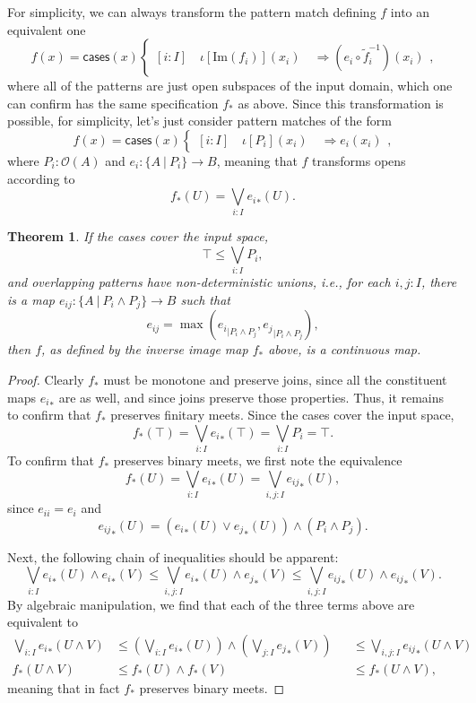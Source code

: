 \documentclass[conference]{IEEEtran}
\newtheorem{theorem}{Theorem}
\newcommand{\suchthat}{\ |\ }
\newcommand{\Open}[1]{\mathcal{O}({#1})}
\newcommand{\restrict}[2]{{#1}_{|{#2}}}
\newcommand{\Img}[1]{\text{Im}\left({#1}\right)}
\newcommand{\oinclf}[1]{\iota[{#1}]}
\newcommand{\oincl}[2]{\oinclf{#1} \left({#2}\right)}
\newcommand{\Branch}{\Rightarrow}
\begin{document}
For simplicity, we can always transform the pattern match defining $f$ into an equivalent one
\[
f(x) = \mathsf{cases}(x)
\begin{cases}
[i : I] \quad \oincl{\Img{f_i}}{x_i} \quad \Branch (e_i \circ \tilde{f}_i^{-1})(x_i)
\end{cases},
\]
where all of the patterns are just open subspaces of the input domain, which one can confirm has the same specification $f_*$ as above. Since this transformation is possible, for simplicity, let's just consider pattern matches of the form
\[
f(x) = \mathsf{cases}(x)
\begin{cases}
[i : I] \quad \oincl{P_i}{x_i} \quad \Branch e_i(x_i)
\end{cases},
\]
where $P_i : \Open{A}$ and $e_i : \{ A \suchthat P_i \} \to B$, meaning that $f$ transforms opens according to
\[
f_*(U) = \bigvee_{i : I} {e_i}_*(U).
\]

\begin{theorem}
If the cases cover the input space,
\[
\top \le \bigvee_{i : I} P_i \tag{covering},
\]
and overlapping patterns have non-deterministic unions, i.e., for each $i, j : I$, there is a map $e_{ij} : \{A \suchthat P_i \wedge P_j \} \to B$ such that
\[
e_{ij} = \max( \restrict{e_i}{P_i \wedge P_j}, \restrict{e_j}{P_i \wedge P_j} ), \tag{gluing}
\]
then $f$, as defined by the inverse image map $f_*$ above, is a continuous map.
\end{theorem}
\begin{proof}
Clearly $f_*$ must be monotone and preserve joins, since all the constituent maps ${e_i}_*$ are as well, and since joins preserve those properties. Thus, it remains to confirm that $f_*$ preserves finitary meets.
Since the cases cover the input space,
\[
f_*(\top) = \bigvee_{i : I} {e_i}_*(\top) = \bigvee_{i : I}P_i = \top.
\]
To confirm that $f_*$ preserves binary meets, we first note the equivalence
\[
f_*(U) = \bigvee_{i : I} {e_i}_*(U) = \bigvee_{i, j : I} {e_{ij}}_*(U),
\]
since $e_{ii} = e_i$ and 
\[
{e_{ij}}_*(U) = \left( {e_i}_*(U) \vee {e_j}_*(U) \right) \wedge \left(P_i \wedge P_j \right).
\]

Next, the following chain of inequalities should be apparent:
\[
\bigvee_{i : I} {e_i}_*(U) \wedge {e_i}_*(V)
\le 
\bigvee_{i, j : I} {e_i}_*(U) \wedge {e_j}_*(V)
\le
\bigvee_{i, j : I} {e_{ij}}_*(U) \wedge {e_{ij}}_*(V).
\]
By algebraic manipulation, we find that each of the three terms above are equivalent to
\begin{align*}
\bigvee_{i : I} {e_i}_*(U \wedge V)
&\le 
\left(\bigvee_{i : I} {e_i}_*(U) \right) \wedge \left( \bigvee_{j: I} {e_j}_*(V) \right)
&&\le
\bigvee_{i, j : I} {e_{ij}}_*(U \wedge V)
\\
f_*(U \wedge V) 
&\le f_*(U) \wedge f_*(V)
&&\le f_*(U \wedge V),
\end{align*}
meaning that in fact $f_*$ preserves binary meets.
\end{proof}
\end{document}
